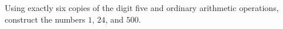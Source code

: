 Using exactly six copies of the digit five and ordinary arithmetic operations, construct the numbers $1$, $24$, and $500$.
